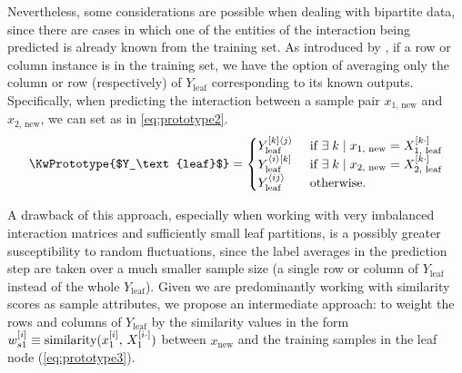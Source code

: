 Nevertheless, some considerations are possible when dealing with bipartite data, since there are cases in which one of the entities of the interaction being predicted is already known from the training set. As introduced by , if a row or column instance is in the training set, we have the option of averaging only the column or row (respectively) of $Y_\text{leaf}$ corresponding to its known outputs. Specifically, when predicting the interaction between a sample pair $x_{1\text{, new}}$ and $x_{2\text{, new}}$, we can set \KwPrototype as in \autoref{eq:prototype2}.
\begin{equation}
    \KwPrototype{$Y_\text{leaf}$} =
    \begin{cases}
        Y_\text{leaf}^{[k]\ang{j}} & \text{ if }
            \exists \; k \mid x_{1\text{, new}} = X_{1\text{, leaf}}\el{k\cdot}\\
        Y_\text{leaf}^{\ang{i}[k]} & \text{ if }
            \exists \; k \mid x_{2\text{, new}} = X_{2\text{, leaf}}\el{k\cdot}\\
        Y_\text{leaf}\mel{ij} & \text{ otherwise.}
    \end{cases}
    \label{eq:prototype2}
\end{equation}

A drawback of this approach, especially when working with very imbalanced interaction matrices and sufficiently small leaf partitions, is a possibly greater susceptibility to random fluctuations, since the label averages in the prediction step are taken over a much smaller sample size (a single row or column of $Y_\text{leaf}$ instead of the whole $Y_\text{leaf}$). Given we are predominantly working with similarity scores as sample attributes, we propose an intermediate approach: to weight the rows and columns of $Y_\text{leaf}$ by the similarity values in the form $w_{s1}^{[i]} \equiv \text{similarity}(x_1^{[i]}, \, X_1^{[i\cdot]})$ between $x_\text{new}$ and the training samples in the leaf node (\autoref{eq:prototype3}).

